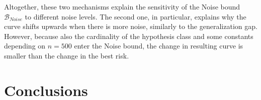 \documentclass[reqno]{amsart}
\let\oldsection\section
\renewcommand{\section}{\clearpage\thispagestyle{plain}\oldsection}
\begin{document}
Altogether, these two mechanisms explain the sensitivity of the Noise bound $\mathcal B_{Noise}$ to different noise levels. The second one, in particular, explains why the curve shifts upwards when there is more noise, similarly to the generalization gap. However, because also the cardinality of the hypothesis class and some constants depending on $n=500$ enter the Noise bound, the change in resulting curve is smaller than the change in the best risk. 

\newpage
\section{Conclusions}\label{sec: concl}


\newpage



\newpage
\appendix

\end{document}

